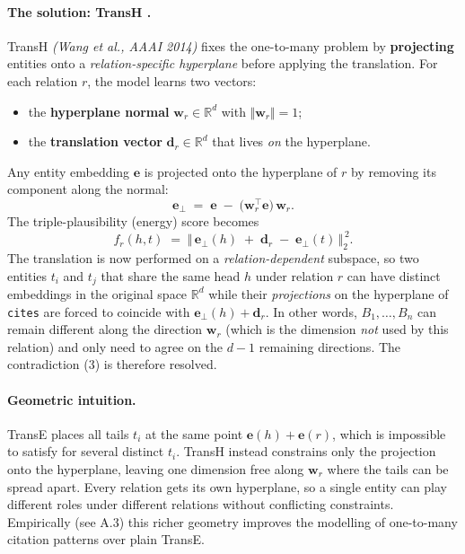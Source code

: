 \documentclass{article}
\begin{document}
\paragraph{The solution: TransH \cite{wang2014transh}.}
TransH \emph{(Wang et al., AAAI 2014)} fixes the one-to-many problem by
\textbf{projecting} entities onto a \emph{relation-specific hyperplane}
before applying the translation. For each relation $r$, the model learns two
vectors:
\begin{itemize}[leftmargin=1.5em,nosep]
    \item the \textbf{hyperplane normal} $\mathbf{w}_r \in \mathbb{R}^d$ with
          $\Vert\mathbf{w}_r\Vert = 1$;
    \item the \textbf{translation vector} $\mathbf{d}_r \in \mathbb{R}^d$
          that lives \emph{on} the hyperplane.
\end{itemize}
Any entity embedding $\mathbf{e}$ is projected onto the hyperplane of $r$ by
removing its component along the normal:
\begin{equation}
    \mathbf{e}_\perp
    \;=\;
    \mathbf{e} \;-\; \big(\mathbf{w}_r^{\top}\mathbf{e}\big)\,\mathbf{w}_r.
\end{equation}
The triple-plausibility (energy) score becomes
\begin{equation}
    f_r(h, t)
    \;=\;
    \big\Vert\,
        \mathbf{e}_\perp(h) \;+\; \mathbf{d}_r \;-\; \mathbf{e}_\perp(t)
    \,\big\Vert_{2}^{\,2}.
\end{equation}
The translation is now performed on a \emph{relation-dependent} subspace, so
two entities $t_i$ and $t_j$ that share the same head $h$ under relation $r$
can have distinct embeddings in the original space $\mathbb{R}^d$ while their
\emph{projections} on the hyperplane of \texttt{cites} are forced to coincide
with $\mathbf{e}_\perp(h)+\mathbf{d}_r$. In other words, $B_1,\dots,B_n$ can
remain different along the direction $\mathbf{w}_r$ (which is the dimension
\textit{not} used by this relation) and only need to agree on the $d-1$
remaining directions. The contradiction (3) is therefore resolved.

\paragraph{Geometric intuition.}
TransE places all tails $t_i$ at the same point
$\mathbf{e}(h)+\mathbf{e}(r)$, which is impossible to satisfy for several
distinct $t_i$. TransH instead constrains only the projection onto the
hyperplane, leaving one dimension free along $\mathbf{w}_r$ where the tails
can be spread apart. Every relation gets its own hyperplane, so a single
entity can play different roles under different relations without conflicting
constraints. Empirically (see A.3) this richer geometry improves the
modelling of one-to-many citation patterns over plain TransE.
\end{document}
